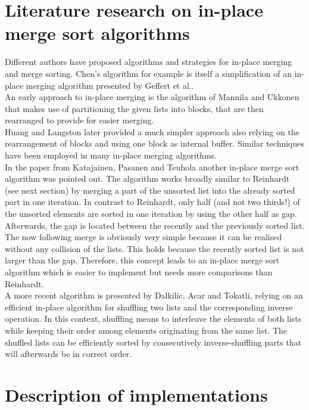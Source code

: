 \documentclass[11pt,pdftex,a4paper, twocolumn]{article}
\begin{document}
\section*{Literature research on in-place merge sort algorithms}
Different authors have proposed algorithms and strategies for in-place merging and merge sorting. Chen’s algorithm for example is itself a simplification of an in-place merging algorithm presented by Geffert et al.\cite{geffert2000asymptotically}. \\
An early approach to in-place merging is the algorithm of Mannila and Ukkonen\cite{mannila1984simple} that makes use of partitioning the given lists into blocks, that are then rearranged to provide for easier merging. \\
Huang and Langston later provided a much simpler approach also relying on the rearrangement of blocks and using one block as internal buffer. Similar techniques have been employed in many in-place merging algorithms. \\
In the paper from Katajainen, Pasanen and Teuhola\cite{katajainen1996practical} another in-place merge sort algorithm was pointed out. The algorithm works broadly similar to Reinhardt (see next section) by merging a part of the unsorted list into the already sorted part in one iteration. In contrast to Reinhardt, only half (and not two thirds!) of the unsorted elements are sorted in one iteration by using the other half as gap. Afterwards, the gap is located between the recently and the previously sorted list. The now following merge is obviously very simple because it can be realised without any collision of the lists. This holds because the recently sorted list is not larger than the gap. Therefore, this concept leads to an in-place merge sort algorithm which is easier to implement but needs more comparisons than Reinhardt.  \\
A more recent algorithm is presented by Dalkilic, Acar and Tokatli\cite{dalkilic2011simple}, relying on an efficient in-place algorithm for shuffling two lists and the corresponding inverse operation. In this context, shuffling means to interleave the elements of both lists while keeping their order among elements originating from the same list. The shuffled lists can be efficiently sorted by consecutively inverse-shuffling parts that will afterwards be in correct order. 

\section*{Description of implementations}
\end{document}
